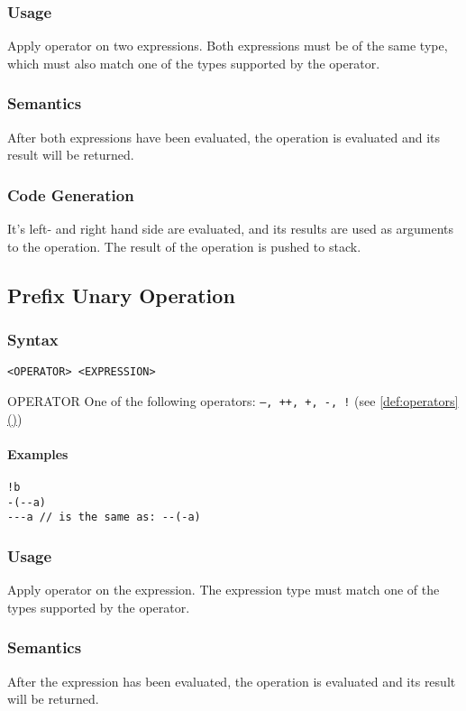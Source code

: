 \documentclass[twoside]{report}
\newcommand*{\fullref}[1]{\hyperref[{#1}]{\ref*{#1} (\nameref*{#1})}}
\newenvironment{mycompactdesc}{\begin{adjustwidth}{0.53cm}{}\begin{compactdesc}}{\end{compactdesc}\end{adjustwidth}}
\begin{document}
\subsubsection*{Usage}
Apply operator on two expressions. Both expressions must be of the same type, which must also match one of the types supported by the operator.
\subsubsection*{Semantics}
After both expressions have been evaluated, the operation is evaluated and its result will be returned.
\subsubsection*{Code Generation}
It's left- and right hand side are evaluated, and its results are used as arguments to the operation. The result of the operation is pushed to stack.


\subsection{Prefix Unary Operation}
\label{def:prefix_unary_operation}
\subsubsection*{Syntax}
\texttt{<OPERATOR> <EXPRESSION>}
\begin{mycompactdesc}
	\item[OPERATOR] One of the following operators: \texttt{---, ++, +, -, !} (see \fullref{def:operators})
\end{mycompactdesc}
\paragraph{Examples}
\begin{verbatim}
!b
-(--a)
---a // is the same as: --(-a)
\end{verbatim}
\subsubsection*{Usage}
Apply operator on the expression. The expression type must match one of the types supported by the operator.
\subsubsection*{Semantics}
After the expression has been evaluated, the operation is evaluated and its result will be returned.
\end{document}
